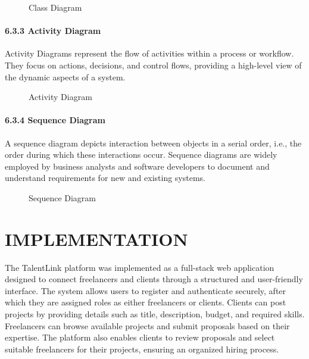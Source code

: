 \documentclass[12pt,a4paper,oneside]{report}
\numberwithin{figure}{chapter}
\numberwithin{table}{chapter}
\begin{document}
\begin{figure}[H]
  \centering
  \caption{Class Diagram}
  \label{fig:class}
\end{figure}

\subsubsection{6.3.3 Activity Diagram}

Activity Diagrams represent the flow of activities within a process or workflow. They
focus on actions, decisions, and control flows, providing a high-level view of the
dynamic aspects of a system.

\begin{figure}[H]
  \centering
  \caption{Activity Diagram}
  \label{fig:activity}
\end{figure}

\subsubsection{6.3.4 Sequence Diagram}

A sequence diagram depicts interaction between objects in a serial order, i.e., the
order during which these interactions occur. Sequence diagrams are widely employed by
business analysts and software developers to document and understand requirements for new
and existing systems.

\begin{figure}[H]
  \centering
  \caption{Sequence Diagram}
  \label{fig:sequence}
\end{figure}

\chapter{IMPLEMENTATION}

The TalentLink platform was implemented as a full-stack web application designed to
connect freelancers and clients through a structured and user-friendly interface. The
system allows users to register and authenticate securely, after which they are assigned
roles as either freelancers or clients. Clients can post projects by providing details
such as title, description, budget, and required skills. Freelancers can browse available
projects and submit proposals based on their expertise. The platform also enables clients
to review proposals and select suitable freelancers for their projects, ensuring an
organized hiring process.
\end{document}
